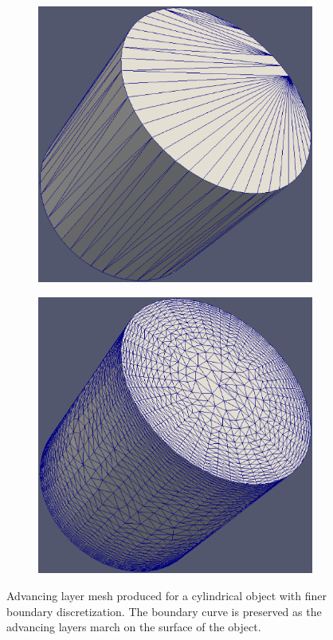 \documentclass[conf]{new-aiaa}
\begin{document}
\begin{figure}[hbt!]
\centering
\begin{subfigure}{.5\textwidth}
  \centering
  \includegraphics[width=.9\linewidth]{cylinder/fine/cyl-fine.eps}
  \caption{}
  \label{cyl-fine}
\end{subfigure}%
\begin{subfigure}{.5\textwidth}
  \centering
  \includegraphics[width=.9\linewidth]{cylinder/fine/cyl-fine-mesh.eps}
  \caption{}
  \label{cyl-fine-mesh}
\end{subfigure}
\caption{Advancing layer mesh produced for a cylindrical object with finer boundary discretization. The boundary curve is preserved as the advancing layers march on the surface of the object.}
\label{cylinder-fine}
\end{figure}
\end{document}
